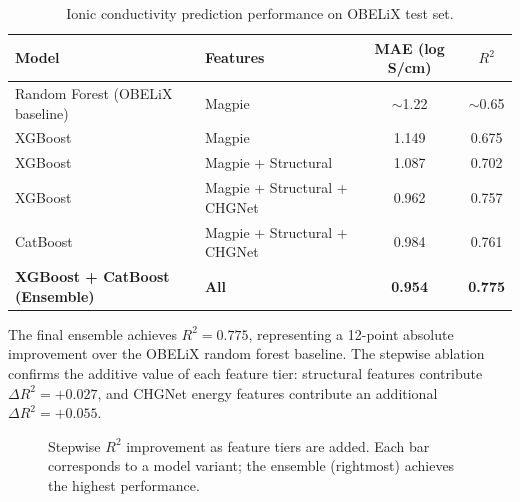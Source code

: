 \documentclass[12pt]{article}
\begin{document}
\begin{table}[h]
\centering
\caption{Ionic conductivity prediction performance on OBELiX test set.}
\label{tab:results}
\begin{tabular}{llcc}
\toprule
Model & Features & MAE (log S/cm) & $R^2$ \\
\midrule
Random Forest (OBELiX baseline) \cite{therrien2025obelix}
  & Magpie & $\sim$1.22 & $\sim$0.65 \\
XGBoost & Magpie & 1.149 & 0.675 \\
XGBoost & Magpie + Structural & 1.087 & 0.702 \\
XGBoost & Magpie + Structural + CHGNet & 0.962 & 0.757 \\
CatBoost & Magpie + Structural + CHGNet & 0.984 & 0.761 \\
\textbf{XGBoost + CatBoost (Ensemble)} & \textbf{All} & \textbf{0.954} & \textbf{0.775} \\
\bottomrule
\end{tabular}
\end{table}

The final ensemble achieves $R^2 = 0.775$, representing a 12-point absolute
improvement over the OBELiX random forest baseline. The stepwise ablation confirms
the additive value of each feature tier: structural features contribute
$\Delta R^2 = +0.027$, and CHGNet energy features contribute an additional
$\Delta R^2 = +0.055$.

\begin{figure}[h]
\centering
{}
\caption{Stepwise $R^2$ improvement as feature tiers are added. Each bar corresponds
to a model variant; the ensemble (rightmost) achieves the highest performance.}
\label{fig:perf}
\end{figure}
\end{document}
